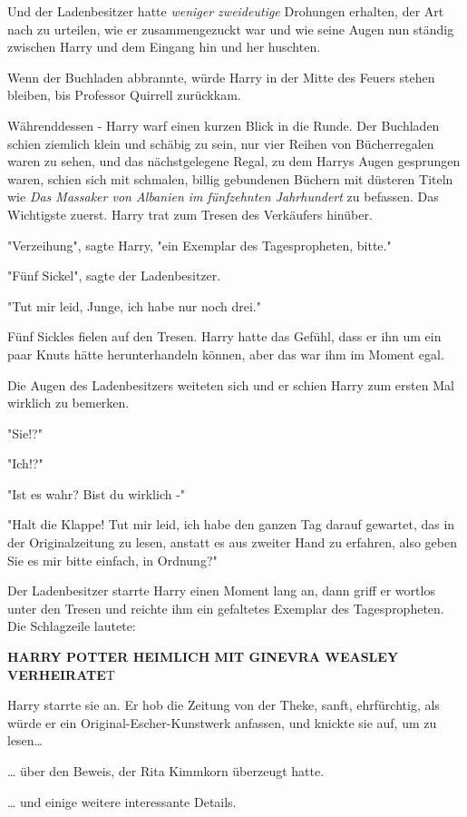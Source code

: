 {Und der Ladenbesitzer hatte \emph{weniger zweideutige} Drohungen erhalten, der Art nach zu urteilen, wie er zusammengezuckt war und wie seine Augen nun ständig zwischen Harry und dem Eingang hin und her huschten.

Wenn der Buchladen abbrannte, würde Harry in der Mitte des Feuers stehen bleiben, bis Professor Quirrell zurückkam.

Währenddessen - Harry warf einen kurzen Blick in die Runde. Der Buchladen schien ziemlich klein und schäbig zu sein, nur vier Reihen von Bücherregalen waren zu sehen, und das nächstgelegene Regal, zu dem Harrys Augen gesprungen waren, schien sich mit schmalen, billig gebundenen Büchern mit düsteren Titeln wie \emph{Das Massaker von Albanien im fünfzehnten Jahrhundert} zu befassen. Das Wichtigste zuerst. Harry trat zum Tresen des Verkäufers hinüber.

"Verzeihung", sagte Harry, "ein Exemplar des Tagespropheten, bitte."

"Fünf Sickel", sagte der Ladenbesitzer.

"Tut mir leid, Junge, ich habe nur noch drei."

Fünf Sickles fielen auf den Tresen. Harry hatte das Gefühl, dass er ihn um ein paar Knuts hätte herunterhandeln können, aber das war ihm im Moment egal.

Die Augen des Ladenbesitzers weiteten sich und er schien Harry zum ersten Mal wirklich zu bemerken.

"Sie!?"

"Ich!?"

"Ist es wahr? Bist du wirklich -"

"Halt die Klappe! Tut mir leid, ich habe den ganzen Tag darauf gewartet, das in der Originalzeitung zu lesen, anstatt es aus zweiter Hand zu erfahren, also geben Sie es mir bitte einfach, in Ordnung?"

Der Ladenbesitzer starrte Harry einen Moment lang an, dann griff er wortlos unter den Tresen und reichte ihm ein gefaltetes Exemplar des Tagespropheten. Die Schlagzeile lautete:

\textbf{HARRY POTTER HEIMLICH MIT GINEVRA WEASLEY VERHEIRATE}T

Harry starrte sie an. Er hob die Zeitung von der Theke, sanft, ehrfürchtig, als würde er ein Original-Escher-Kunstwerk anfassen, und knickte sie auf, um zu lesen…

… über den Beweis, der Rita Kimmkorn überzeugt hatte.

… und einige weitere interessante Details.

}
